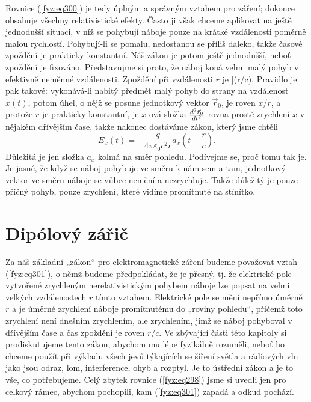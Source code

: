 {    Rovnice (\ref{fyz:eq300}) je tedy úplným a správným vztahem pro záření; dokonce obsahuje 
    všechny relativistické efekty. Často ji však chceme aplikovat na ještě jednodušší situaci, v 
    níž se pohybují náboje pouze na krátké vzdálenosti poměrně malou rychlostí. Pohybují-li se 
    pomalu, nedostanou se příliš daleko, takže časové zpoždění je prakticky konstantní. Náš zákon 
    je potom ještě jednodušší, neboť zpoždění je fixováno. Představujme si proto, že náboj koná 
    velmi malý pohyb v efektivně neměnné vzdálenosti. Zpoždění při vzdálenosti \(r\) je ](r/c). 
    Pravidlo je pak takové: vykonává-li nabitý předmět malý pohyb do strany na vzdálenost \(x(t)\), 
    potom úhel, o nějž se posune jednotkový vektor \(\vec{r}_0\), je roven \(x/r\), a protože \(r\) 
    je prakticky konstantní, je \(x\)-ová složka \(\frac{d^2 \vec{r}_0}{d t^2}\) rovna prostě zrychlení 
    \(x\) v nějakém dřívějším čase, takže nakonec dostáváme zákon, který jsme chtěli
    \begin{equation}\label{fyz:eq301}
      E_x(t) = -\frac{q}{4\pi\varepsilon_0c^2r}a_x\left(t-\frac{r}{c}\right).
    \end{equation}
    Důležitá je jen složka \(a_x\) kolmá na směr pohledu. Podívejme se, proč tomu tak je. Je jasné, 
    že když se náboj pohybuje ve směru k nám sem a tam, jednotkový vektor ve směru náboje se
    vůbec nemění a nezrychluje. Takže důležitý je pouze příčný pohyb, pouze zrychlení, které vidíme 
    promítnuté na stínítko.
    
  \section{Dipólový zářič}\label{fyz:IchapXXVIIIsecIII}
    Za náš základní „zákon“ pro elektromagnetické záření budeme považovat vztah (\ref{fyz:eq301}), 
    o němž budeme předpokládat, že je přesný, tj. že elektrické pole vytvořené zrychleným 
    nerelativistickým pohybem náboje lze popsat na velmi velkých vzdálenostech \(r\) tímto vztahem. 
    Elektrické pole se mění nepřímo úměrně \(r\) a je úměrné zrychlení náboje promítnutému do 
    „roviny pohledu“, přičemž toto zrychlení není dnešním zrychlením, ale zrychlením, jímž se náboj 
    pohyboval v dřívějším čase a čas zpoždění je roven \(r/c\). Ve zbývající části této kapitoly si 
    prodiskutujeme tento zákon, abychom mu lépe fyzikálně rozuměli, neboť ho chceme použít při 
    výkladu všech jevů týkajících se šíření světla a rádiových vln jako jsou odraz, lom, 
    interference, ohyb a rozptyl. Je to ústřední zákon a je to vše, co potřebujeme. Celý zbytek 
    rovnice (\ref{fyz:eq298}) jsme si uvedli jen pro celkový rámec, abychom pochopili, kam 
    (\ref{fyz:eq301}) zapadá a odkud pochází. 

}
